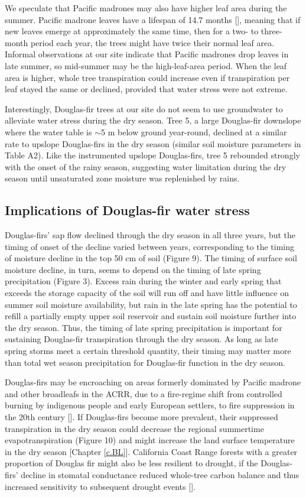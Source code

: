 We speculate that Pacific madrones may also have higher leaf area during the summer.  Pacific madrone leaves have a lifespan of 14.7 months [\cite{ackerly2004functional}], meaning that if new leaves emerge at approximately the same time, then for a two- to three-month period each year, the trees might have twice their normal leaf area.  Informal observations at our site indicate that Pacific madrones drop leaves in late summer, so mid-summer may be the high-leaf-area period.  When the leaf area is higher, whole tree transpiration could increase even if transpiration per leaf stayed the same or declined, provided that water stress were not extreme.

Interestingly, Douglas-fir trees at our site do not seem to use groundwater to alleviate water stress during the dry season.  Tree 5, a large Douglas-fir downslope where the water table is $\sim$5 m below ground year-round, declined at a similar rate to upslope Douglas-firs in the dry season (similar soil moisture parameters in Table A2).  Like the instrumented upslope Douglas-firs, tree 5 rebounded strongly with the onset of the rainy season, suggesting water limitation during the dry season until unsaturated zone moisture was replenished by rains.

\subsection{Implications of Douglas-fir water stress}
Douglas-firs' sap flow declined through the dry season in all three years, but the timing of onset of the decline varied between years, corresponding to the timing of moisture decline in the top 50 cm of soil (Figure 9).  The timing of surface soil moisture decline, in turn, seems to depend on the timing of late spring precipitation (Figure 3).  Excess rain during the winter and early spring that exceeds the storage capacity of the soil will run off and have little influence on summer soil moisture availability, but rain in the late spring has the potential to refill a partially empty upper soil reservoir and sustain soil moisture further into the dry season.  Thus, the timing of late spring precipitation is important for sustaining Douglas-fir transpiration through the dry season.  As long as late spring storms meet a certain threshold quantity, their timing may matter more than total wet season precipitation for Douglas-fir function in the dry season.

Douglas-firs may be encroaching on areas formerly dominated by Pacific madrone and other broadleafs in the ACRR, due to a fire-regime shift from controlled burning by indigenous people and early European settlers, to fire suppression in the 20th century [\cite{johnsonACRR}].  If Douglas-firs become more prevalent, their suppressed transpiration in the dry season could decrease the regional summertime evapotranspiration (Figure 10) and might increase the land surface temperature in the dry season [Chapter \ref{c.BL}].  California Coast Range forests with a greater proportion of Douglas fir might also be less resilient to drought, if the Douglas-firs' decline in stomatal conductance reduced whole-tree carbon balance and thus increased sensitivity to subsequent drought events [\cite{mcdowell2008mechanisms}].

